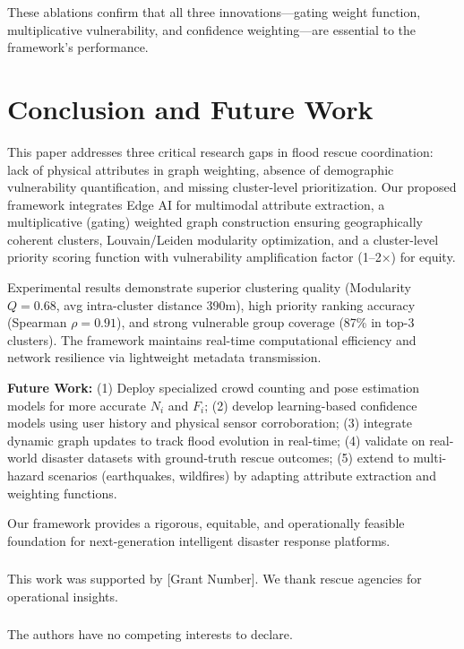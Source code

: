 \documentclass[runningheads]{llncs}
\begin{document}
These ablations confirm that all three innovations---gating weight function, multiplicative vulnerability, and confidence weighting---are essential to the framework's performance.

\section{Conclusion and Future Work}

This paper addresses three critical research gaps in flood rescue coordination: lack of physical attributes in graph weighting, absence of demographic vulnerability quantification, and missing cluster-level prioritization. Our proposed framework integrates Edge AI for multimodal attribute extraction, a multiplicative (gating) weighted graph construction ensuring geographically coherent clusters, Louvain/Leiden modularity optimization, and a cluster-level priority scoring function with vulnerability amplification factor (1--2×) for equity.

Experimental results demonstrate superior clustering quality (Modularity $Q=0.68$, avg intra-cluster distance 390m), high priority ranking accuracy (Spearman $\rho=0.91$), and strong vulnerable group coverage (87\% in top-3 clusters). The framework maintains real-time computational efficiency and network resilience via lightweight metadata transmission.

\textbf{Future Work:} (1) Deploy specialized crowd counting and pose estimation models for more accurate $N_i$ and $F_i$; (2) develop learning-based confidence models using user history and physical sensor corroboration; (3) integrate dynamic graph updates to track flood evolution in real-time; (4) validate on real-world disaster datasets with ground-truth rescue outcomes; (5) extend to multi-hazard scenarios (earthquakes, wildfires) by adapting attribute extraction and weighting functions.

Our framework provides a rigorous, equitable, and operationally feasible foundation for next-generation intelligent disaster response platforms.

\begin{credits}
\subsubsection{\ackname}
This work was supported by [Grant Number]. We thank rescue agencies for operational insights.

\subsubsection{\discintname}
The authors have no competing interests to declare.
\end{credits}



\end{document}
